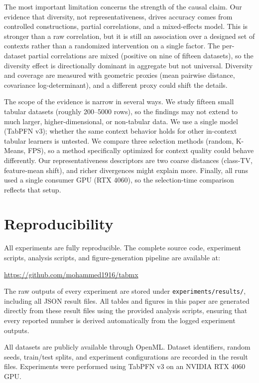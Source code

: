 \documentclass{article}
\begin{document}
The most important limitation concerns the strength of the causal claim. Our evidence that diversity, not representativeness, drives accuracy comes from controlled constructions, partial correlations, and a mixed-effects model. This is stronger than a raw correlation, but it is still an association over a designed set of contexts rather than a randomized intervention on a single factor. The per-dataset partial correlations are mixed (positive on nine of fifteen datasets), so the diversity effect is directionally dominant in aggregate but not universal. Diversity and coverage are measured with geometric proxies (mean pairwise distance, covariance log-determinant), and a different proxy could shift the details.

The scope of the evidence is narrow in several ways. We study fifteen small tabular datasets (roughly 200--5000 rows), so the findings may not extend to much larger, higher-dimensional, or non-tabular data. We use a single model (TabPFN v3); whether the same context behavior holds for other in-context tabular learners is untested. We compare three selection methods (random, K-Means, FPS), so a method specifically optimized for context quality could behave differently. Our representativeness descriptors are two coarse distances (class-TV, feature-mean shift), and richer divergences might explain more. Finally, all runs used a single consumer GPU (RTX 4060), so the selection-time comparison reflects that setup.

\section*{Reproducibility}

All experiments are fully reproducible. The complete source code, experiment scripts, analysis scripts, and figure-generation pipeline are available at:

\begin{center}
\url{https://github.com/mohammed1916/tabmx}
\end{center}

The raw outputs of every experiment are stored under \texttt{experiments/results/}, including all JSON result files. All tables and figures in this paper are generated directly from these result files using the provided analysis scripts, ensuring that every reported number is derived automatically from the logged experiment outputs.

All datasets are publicly available through OpenML. Dataset identifiers, random seeds, train/test splits, and experiment configurations are recorded in the result files. Experiments were performed using TabPFN v3 on an NVIDIA RTX 4060 GPU.
\end{document}
